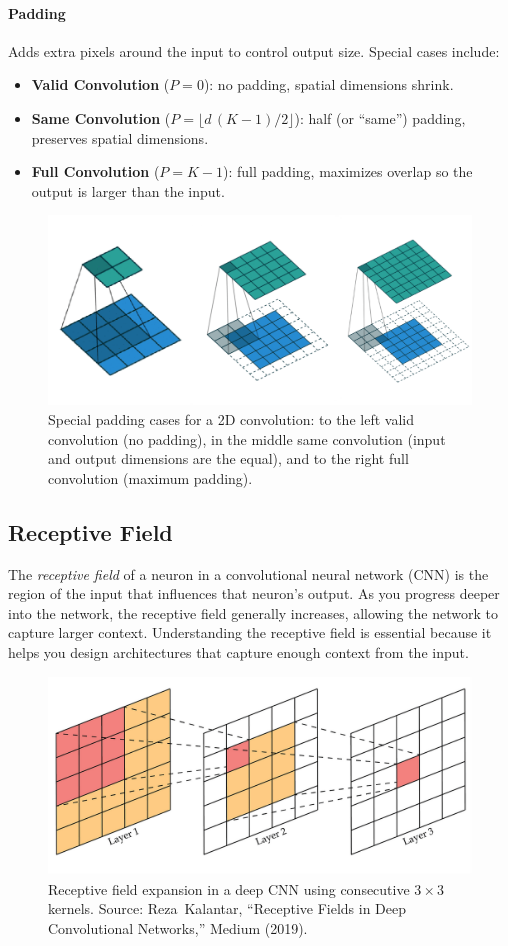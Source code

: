 \documentclass{article}
\begin{document}
\paragraph{Padding} Adds extra pixels around the input to control output size. Special cases include:
\begin{itemize}
    \item \textbf{Valid Convolution} ($P=0$): no padding, spatial dimensions shrink.
    \item \textbf{Same Convolution} ($P=\lfloor d\,(K-1)/2\rfloor$): half (or “same”) padding, preserves spatial dimensions.
    \item \textbf{Full Convolution} ($P=K-1$): full padding, maximizes overlap so the output is larger than the input.
\end{itemize}

\begin{figure}[ht]
    \centering
    \includegraphics[width=0.7\linewidth]{graphics/S5CNN/padding_cnn.png}
    \caption{Special padding cases for a 2D convolution: to the left valid convolution (no padding), in the middle same convolution (input and output dimensions are the equal), and to the right full convolution (maximum padding).}
    \label{fig:padding-cnn}
\end{figure}

\subsection{Receptive Field}

The \emph{receptive field} of a neuron in a convolutional neural network (CNN) is the region of the input that influences that neuron's output. As you progress deeper into the network, the receptive field generally increases, allowing the network to capture larger context. Understanding the receptive field is essential because it helps you design architectures that capture enough context from the input.

\begin{figure}[ht]
    \centering
    \includegraphics[width=0.7\linewidth]{graphics/S5CNN/receptive_field.png}
    \caption{Receptive field expansion in a deep CNN using consecutive $3\times3$ kernels. Source: Reza Kalantar, “Receptive Fields in Deep Convolutional Networks,” Medium (2019).}
    \label{fig:receptive-field}
\end{figure}
\end{document}
